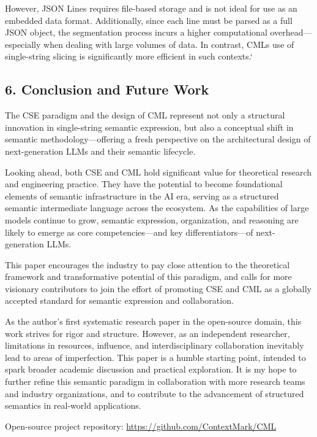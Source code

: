 \documentclass[conference]{IEEEtran}
\begin{document}
However, JSON Lines requires file-based storage and is not ideal for use
as an embedded data format. Additionally, since each line must be parsed
as a full JSON object, the segmentation process incurs a higher
computational overhead---especially when dealing with large volumes of
data. In contrast, CML\textquotesingle s use of single-string slicing is
significantly more efficient in such contexts.`

\subsection{6. Conclusion and Future
Work}\label{6-conclusion-and-future-work}

The CSE paradigm and the design of CML represent not only a structural
innovation in single-string semantic expression, but also a conceptual
shift in semantic methodology---offering a fresh perspective on the
architectural design of next-generation LLMs and their semantic
lifecycle.

Looking ahead, both CSE and CML hold significant value for theoretical
research and engineering practice. They have the potential to become
foundational elements of semantic infrastructure in the AI era, serving
as a structured semantic intermediate language across the ecosystem. As
the capabilities of large models continue to grow, semantic expression,
organization, and reasoning are likely to emerge as core
competencies---and key differentiators---of next-generation LLMs.

This paper encourages the industry to pay close attention to the
theoretical framework and transformative potential of this paradigm, and
calls for more visionary contributors to join the effort of promoting
CSE and CML as a globally accepted standard for semantic expression and
collaboration.

As the author's first systematic research paper in the open-source
domain, this work strives for rigor and structure. However, as an
independent researcher, limitations in resources, influence, and
interdisciplinary collaboration inevitably lead to areas of
imperfection. This paper is a humble starting point, intended to spark
broader academic discussion and practical exploration. It is my hope to
further refine this semantic paradigm in collaboration with more
research teams and industry organizations, and to contribute to the
advancement of structured semantics in real-world applications.

Open-source project repository: \url{https://github.com/ContextMark/CML}
\end{document}
